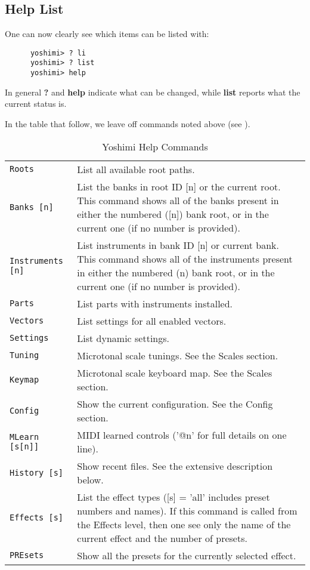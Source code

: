\subsection{Help List}
\label{subsec:command_line_help_list}

   One can now clearly see which items can be listed with:

   \begin{verbatim}
      yoshimi> ? li
      yoshimi> ? list
      yoshimi> help
   \end{verbatim}

   In general \textbf{?} and \textbf{help} indicate what can be changed, while
   \textbf{list} reports what the current status is.

   In the table that follow, we leave off commands noted above
   (see ).

\begin{center}
\begin{longtable}{p{4cm} p{10cm}}
\caption[Yoshimi Help Commands]{Yoshimi Help Commands} \\

\texttt{Roots} &
   List all available root paths. \\
\texttt{Banks [n]} &
   List the banks in root ID [n] or the current root.
   This command shows all of the banks present in either the numbered ([n])
   bank root, or in the current one (if no number is provided).  \\
\texttt{Instruments [n]} &
   List instruments in bank ID [n] or current bank.
   This command shows all of the instruments present in either the numbered
   (n) bank root, or in the current one (if no number is provided).  \\
\texttt{Parts} &
   List parts with instruments installed. \\
\texttt{Vectors} &
   List settings for all enabled vectors. \\
\texttt{Settings} &
   List dynamic settings. \\
\texttt{Tuning} &
   Microtonal scale tunings. See the Scales section. \\
\texttt{Keymap} &
   Microtonal scale keyboard map.  See the Scales section. \\
\texttt{Config} &
   Show the current configuration. See the Config section. \\
\texttt{MLearn [s[n]]} &
   MIDI learned controls ('@n' for full details on one line). \\
\texttt{History [s]} &
   Show recent files. See the extensive description below. \\
\texttt{Effects [s]} &
   List the effect types ([s] = 'all' includes preset numbers and names).
   If this command is called from the Effects level, then one see only the name
   of the current effect and the number of presets. \\
\texttt{PREsets} &
   Show all the presets for the currently selected effect. \\

\end{longtable}
\end{center}

